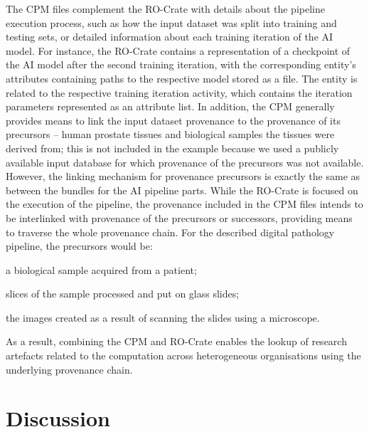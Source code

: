 \documentclass[10pt,letterpaper]{article}
\begin{document}
The CPM files complement the RO-Crate with details about the pipeline execution process, such as how the input dataset was split into training and testing sets, or detailed information about each training iteration of the AI model.
For instance, the RO-Crate contains a representation of a checkpoint of the AI model after the second training iteration, with the corresponding entity's attributes containing paths to the respective model stored as a file.
The entity is related to the respective training iteration activity, which contains the iteration parameters represented as an attribute list.
In addition, the CPM generally provides means to link the input dataset provenance to the provenance of its precursors -- human prostate tissues and biological samples the tissues were derived from; this is not included in the example because we used a publicly available input database for which provenance of the precursors was not available.
However, the linking mechanism for provenance precursors is exactly the same as between the bundles for the AI pipeline parts.
While the RO-Crate is focused on the execution of the pipeline, the provenance included in the CPM files intends to be interlinked with provenance of the precursors or successors, providing means to traverse the whole provenance chain.
For the described digital pathology pipeline, the precursors would be:
\begin{inlineenum}
\item a biological sample acquired from a patient;
\item slices of the sample processed and put on glass slides;
\item the images created as a result of scanning the slides using a microscope.
\end{inlineenum}
As a result, combining the CPM and RO-Crate enables the lookup of research artefacts related to the computation across heterogeneous organisations using the underlying provenance chain.


%
\section{Discussion}\label{discussion}
\end{document}
